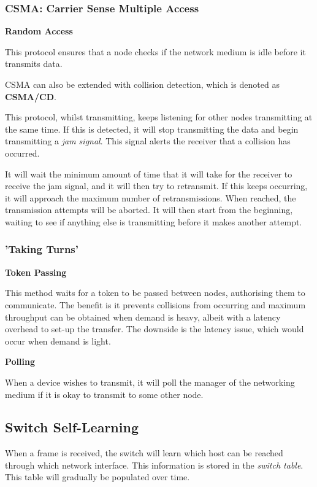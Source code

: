 \documentclass{article}
\begin{document}
\subsubsection{CSMA: Carrier Sense Multiple Access}

\textbf{Random Access}

This protocol ensures that a node checks if the network medium is idle before it transmits data.

CSMA can also be extended with collision detection, which is denoted as \textbf{CSMA/CD}.

This protocol, whilst transmitting, keeps listening for other nodes transmitting at the same time. If this is detected, it will stop transmitting the data and begin transmitting a \textit{jam signal}. This signal alerts the receiver that a collision has occurred. 

It will wait the minimum amount of time that it will take for the receiver to receive the jam signal, and it will then try to retransmit. If this keeps occurring, it will approach the maximum number of retransmissions. When reached, the transmission attempts will be aborted. It will then start from the beginning, waiting to see if anything else is transmitting before it makes another attempt.

\subsubsection{'Taking Turns'}

\textbf{Token Passing}

This method waits for a token to be passed between nodes, authorising them to communicate. The benefit is it prevents collisions from occurring and maximum throughput can be obtained when demand is heavy, albeit with a latency overhead to set-up the transfer. The downside is the latency issue, which would occur when demand is light.

\textbf{Polling}

When a device wishes to transmit, it will poll the manager of the networking medium if it is okay to transmit to some other node.

\subsection{Switch Self-Learning}

When a frame is received, the switch will learn which host can be reached through which network interface. This information is stored in the \textit{switch table}. This table will gradually be populated over time.
\end{document}
